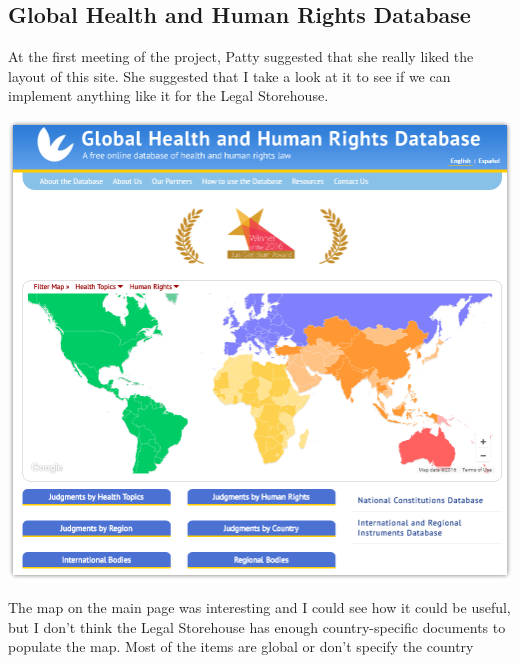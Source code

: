 \documentclass{article}
\begin{document}
\subsection{Global Health and Human Rights Database}
At the first meeting of the project, Patty suggested that she really liked the layout of this site. She suggested that I take a look at it to see if we can implement anything like it for the Legal Storehouse. 

\noindent\includegraphics[width=\textwidth]{2016-06-09-Global-Health-Main}

The map on the main page was interesting and I could see how it could be useful, but I don't think the Legal Storehouse has enough country-specific documents to populate the map. Most of the items are global or don't specify the country 
\end{document}
